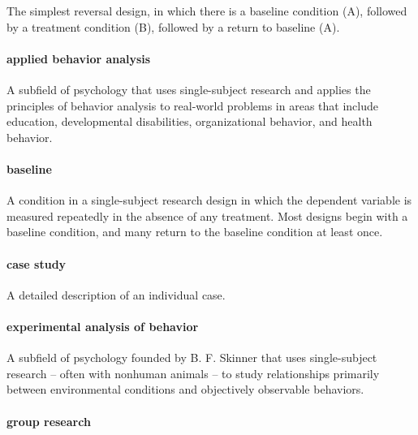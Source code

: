 \documentclass[
]{krantz}
\begin{document}
The simplest reversal design, in which there is a baseline condition (A), followed by a treatment condition (B), followed by a return to baseline (A).

\paragraph*{applied behavior analysis}\label{applied-behavior-analysis}

A subfield of psychology that uses single-subject research and applies the principles of behavior analysis to real-world problems in areas that include education, developmental disabilities, organizational behavior, and health behavior.

\paragraph*{baseline}\label{baseline}

A condition in a single-subject research design in which the dependent variable is measured repeatedly in the absence of any treatment. Most designs begin with a baseline condition, and many return to the baseline condition at least once.

\paragraph*{case study}\label{case-study}

A detailed description of an individual case.

\paragraph*{experimental analysis of behavior}\label{experimental-analysis-of-behavior}

A subfield of psychology founded by B. F. Skinner that uses single-subject research -- often with nonhuman animals -- to study relationships primarily between environmental conditions and objectively observable behaviors.

\paragraph*{group research}\label{group-research}
\end{document}
